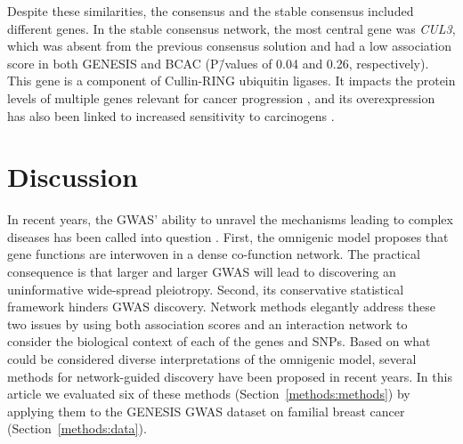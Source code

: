 \documentclass[10pt,letterpaper]{article}
\begin{document}
Despite these similarities, the consensus and the stable consensus included different genes. In the stable consensus network, the most central gene was \emph{CUL3}, which was absent from the previous consensus solution and had a low association score in both GENESIS and BCAC (P\=/values of 0.04 and 0.26, respectively). This gene is a component of Cullin-RING ubiquitin ligases. It impacts the protein levels of multiple genes relevant for cancer progression \cite{Chen2016}, and its overexpression has also been linked to increased sensitivity to carcinogens \cite{Loignon2009}.

\section{Discussion}

In recent years, the GWAS' ability to unravel the mechanisms leading to complex diseases has been called into question \cite{boyle_expanded_2017}. First, the omnigenic model proposes that gene functions are interwoven in a dense co-function network. The practical consequence is that larger and larger GWAS will lead to discovering an uninformative wide-spread pleiotropy. Second, its conservative statistical framework hinders GWAS discovery. Network methods elegantly address these two issues by using both association scores and an interaction network to consider the biological context of each of the genes and SNPs. Based on what could be considered diverse interpretations of the omnigenic model, several methods for network-guided discovery have been proposed in recent years. In this article we evaluated six of these methods (Section~\ref{methods:methods}) by applying them to the GENESIS GWAS dataset on familial breast cancer (Section~\ref{methods:data}).
\end{document}
